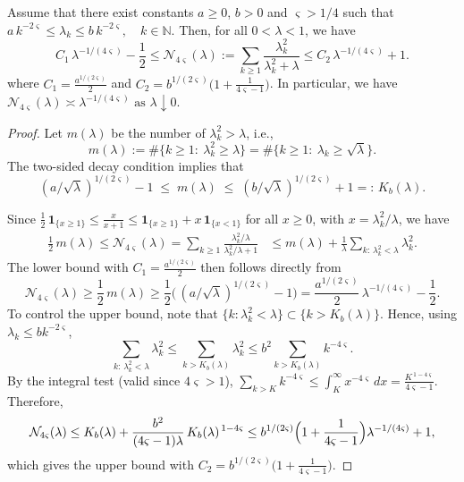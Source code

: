 \documentclass[10pt,a4paper]{amsart}
\begin{document}
 \begin{lemma}\label{lemma:effdim_Bd}
Assume that there exist constants $a\geq 0$, $b>0$ and $\varsigma>1/4$ such that
$ a\,k^{-2\varsigma} \le \lambda_k \le  b\,k^{-2\varsigma}, \quad k\in\mathbb N$. 
Then, for all $0<\lambda<1$, we have  
\[
C_1\,\lambda^{-1/(4\varsigma)}-\frac1 2
 \le 
\mathcal{N}_{4\varsigma}(\lambda) := \sum_{k\ge1}\frac{\lambda^2_k}{\lambda^2_k+\lambda}
 \le 
C_2\,\lambda^{-1/(4\varsigma)}+1.
\]
where $C_1 = \frac{a^{1/(2\varsigma)}}{2}$
and $C_2 = b^{1/(2\varsigma)}\Big(1+\frac{1}{4\varsigma-1}\Big)$. 
In particular, we have 
$\mathcal{N}_{4\varsigma}(\lambda) \asymp \lambda^{-1/(4\varsigma)} \text{ as }\lambda\downarrow 0.$ 
\end{lemma}

\begin{proof}
Let $m(\lambda)$ be the number of $\lambda^2_k>\lambda$, i.e.,
$$m(\lambda) := \#\{k\ge1:\ \lambda^2_k\ge \lambda\}=\#\{k\ge1:\ \lambda_k\ge \sqrt{\lambda}\}.$$  
The two-sided decay condition implies that 
\[
(a/\sqrt{\lambda})^{1/(2\varsigma)}-1
\;\le\;
m(\lambda)
\;\le\;
(b/\sqrt{\lambda})^{1/(2\varsigma)}+1
=:\,K_b(\lambda).
\tag{1}
\]

\noindent Since $\frac12\,\mathbf 1_{\{x\ge1\}}  \le  \frac{x}{x+1}  \le 
\mathbf 1_{\{x\ge1\}} + x\,\mathbf 1_{\{x<1\}}$ for all $x\ge0$, with $x=\lambda_k^2/\lambda$, we have 
\begin{align*}
\frac12\,m(\lambda)  \le \mathcal{N}_{4\varsigma}(\lambda) = \sum_{k\ge1}\frac{\lambda_k^2/\lambda}{\lambda_k^2/\lambda+1}
& \le 
m(\lambda)+\frac{1}{\lambda}\sum_{k:\,\lambda_k^2<\lambda}\lambda_k^2.
\end{align*}
The lower bound with $C_1  = \frac{a^{1/(2\varsigma)}}{2}$ then follows directly from 
\[
\mathcal{N}_{4\varsigma}(\lambda) \ge \frac12\,m(\lambda)
 \ge \frac12\Big(\,(a/\sqrt{\lambda})^{1/(2\varsigma)}-1\Big)
 = \frac{a^{1/(2\varsigma)}}{2}\,\lambda^{-1/(4\varsigma)}-\frac12.
\]
To control the upper bound, note that $\{k:\lambda_k^2<\lambda\}\subset\{k>K_b(\lambda)\}$. Hence, using $\lambda_k\le b k^{-2\varsigma}$,
\[
\sum_{k:\,\lambda_k^2<\lambda}\lambda_k^2
\le
\sum_{k>K_b(\lambda)}\lambda_k^2
\le
b^2\sum_{k>K_b(\lambda)}k^{-4\varsigma}.
\]
By the integral test (valid since $4\varsigma>1$),
$\sum_{k>K}k^{-4\varsigma}\le \int_K^\infty x^{-4\varsigma}\,dx
=\frac{K^{\,1-4\varsigma}}{4\varsigma-1}$. Therefore,
\[
\mathcal{N}_{4\varsigma}(\lambda)
 \le 
K_b(\lambda)+\frac{b^2}{(4\varsigma-1)\lambda}\,K_b(\lambda)^{\,1-4\varsigma}
 \le 
b^{1/(2\varsigma)}\Bigl(1+\frac{1}{4\varsigma-1}\Bigr)\lambda^{-1/(4\varsigma)}+1, 
\]
which gives the upper bound with $C_2= b^{1/(2\varsigma)}\Big(1+\frac{1}{4\varsigma-1}\Big) $. 
\end{proof}
\end{document}
